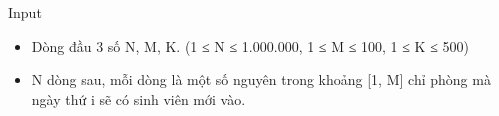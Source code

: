 Input
\begin{itemize}
	\item     Dòng đầu 3 số N, M, K. (1 ≤ N ≤ 1.000.000, 1 ≤ M ≤ 100, 1 ≤ K ≤ 500)   
	\item     N dòng sau, mỗi dòng là một số nguyên trong khoảng [1, M] chỉ phòng mà ngày thứ i sẽ có sinh viên mới vào.   
\end{itemize}